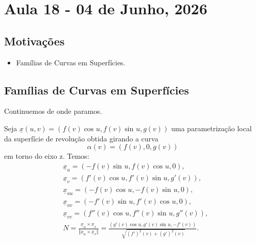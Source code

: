 \documentclass[../differential_geometry.tex]{subfiles}
\begin{document}
\section{Aula 18 - 04 de Junho, 2026}
\subsection{Motivações}
\begin{itemize}
	\item Famílias de Curvas em Superfícies.
\end{itemize}
\subsection{Famílias de Curvas em Superfícies}
Continuemos de onde paramos.
\begin{example}
	Seja \(\underline{x}(u, v) = (f(v)\cos^{}{u}, f(v)\sin^{}{u}, g(v))\) uma parametrização local da superfície de revolução obtida girando a curva
	\[
		\alpha (v) = (f(v), 0, g(v))
	\]
	em torno do eixo z. Temos:
	\begin{align*}
		 & \underline{x}_{u} = (-f(v)\sin^{}{u}, f(v)\cos^{}{u}, 0),                                                                                                                                       \\
		 & \underline{x}_{v} = (f'(v)\cos^{}{u}, f'(v)\sin^{}{u}, g'(v)),                                                                                                                                  \\
		 & \underline{x}_{uu} = (-f(v)\cos^{}{u}, -f(v)\sin^{}{u}, 0),                                                                                                                                     \\
		 & \underline{x}_{uv} = (-f'(v)\sin^{}{u}, f'(v)\cos^{}{u}, 0),                                                                                                                                    \\
		 & \underline{x}_{vv} = (f''(v)\cos^{}{u}, f''(v)\sin^{}{u}, g''(v)),                                                                                                                              \\
		 & N = \frac{\underline{x}_{u}\times \underline{x}_{v}}{\Vert \underline{x}_u \times \underline{x}_v \Vert} = \frac{(g'(v)\cos^{}{u}, g'(v)\sin^{}{u}, -f'(v))}{\sqrt[]{(f')^{2}(v)+(g')^{2}(v)}}.
	\end{align*}

\end{example}
\end{document}
